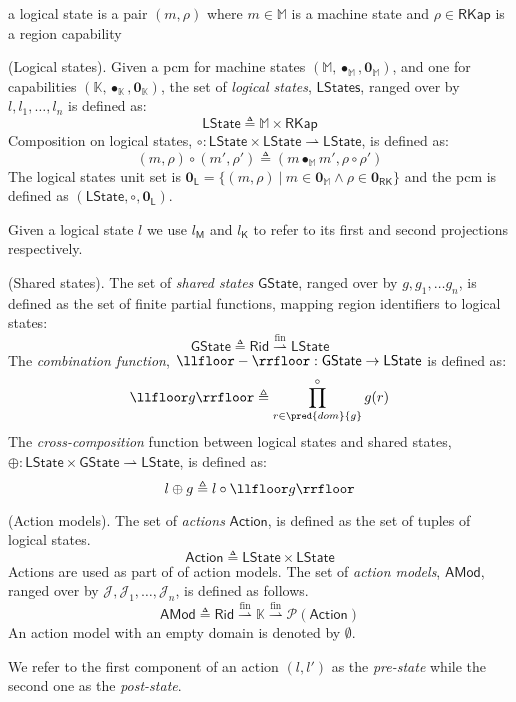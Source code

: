 a logical state is a pair $(m, \rho)$ where $m \in \mathbb{M}$ is a machine state and $\rho \in \mathsf{RKap}$ is a region capability
\begin{defn}
	(Logical states).
	Given a pcm for machine states $(\mathbb{M}, \bullet_\mathbb{M}, \mathbf{0}_\mathbb{M})$, and one for capabilities $(\mathbb{K}, \bullet_\mathbb{K}, \mathbf{0}_\mathbb{K})$, the set of \emph{logical states}, $\mathsf{LStates}$, ranged over by $l, l_1, \ldots, l_n$ is defined as:
	\[
		\mathsf{LState} \triangleq \mathbb{M} \times \mathsf{RKap}
	\]
	Composition on logical states, $\circ : \mathsf{LState} \times \mathsf{LState} \rightharpoonup \mathsf{LState}$, is defined as:
	\[
		(m, \rho) \circ (m', \rho') \triangleq (m \bullet_\mathbb{M} m', \rho \circ \rho')
	\]
	The logical states unit set is $\mathbf{0}_\mathsf{L} = \{ (m, \rho)\ |\ m \in \mathbf{0}_\mathbb{M} \land \rho \in \mathbf{0}_\mathsf{RK} \}$ and the pcm is defined as $(\mathsf{LState}, \circ, \mathbf{0}_\mathsf{L})$.
\end{defn}
Given a logical state $l$ we use $l_\mathsf{M}$ and $l_\mathsf{K}$ to refer to its first and second projections respectively.

\begin{defn}
	(Shared states).
	The set of \emph{shared states} $\mathsf{GState}$, ranged over by $g, g_1, \ldots g_n$, is defined as the set of finite partial functions, mapping region identifiers to logical states:
	\[
		\mathsf{GState} \triangleq \mathsf{Rid} \overset{\text{fin}}{\rightharpoonup} \mathsf{LState}
	\]
	The \emph{combination function}, $\llfloor - \rrfloor : \mathsf{GState} \rightarrow \mathsf{LState}$ is defined as:
	\[
		\llfloor g \rrfloor \triangleq \prod^{\circ}_{r \in \pred{dom}{g}} g(r)
	\]
	The \textit{cross-composition} function between logical states and shared states, $\oplus : \mathsf{LState} \times \mathsf{GState} \rightharpoonup \mathsf{LState}$, is defined as:
	\[
		l \oplus g \triangleq l \circ \llfloor g \rrfloor
	\]
\end{defn}

\begin{defn}
	(Action models).
	The set of \emph{actions} $\mathsf{Action}$, is defined as the set of tuples of logical states.
	\[
		\mathsf{Action} \triangleq \mathsf{LState} \times \mathsf{LState}
	\]
	Actions are used as part of of action models. The set of \emph{action models}, $\mathsf{AMod}$, ranged over by $\mathcal{J}, \mathcal{J}_1, \ldots, \mathcal{J}_n$, is defined as follows.
	\[
		\mathsf{AMod} \triangleq \mathsf{Rid} \overset{\text{fin}}{\rightharpoonup} \mathbb{K} \overset{\text{fin}}{\rightharpoonup} \mathcal{P}(\mathsf{Action})
	\]
	An action model with an empty domain is denoted by $\emptyset$.
\end{defn}
We refer to the first component of an action $(l, l')$ as the \emph{pre-state} while the second one as the \emph{post-state}. 


